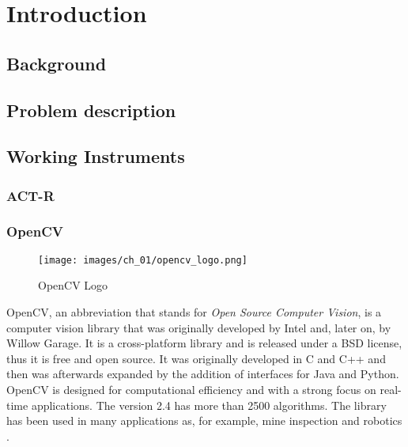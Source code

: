 \chapter{Introduction}
\section{Background}
\section{Problem description}
\section{Working Instruments}
\subsection{ACT-R}
\subsection{OpenCV}
	\begin{wrapfigure}{l}{0.1\textwidth}
  		\begin{center}
  	  	\texttt{[image: images/ch\_01/opencv\_logo.png]}
  		\end{center}
  		\caption{OpenCV Logo}
	\end{wrapfigure}		
	
	OpenCV, an abbreviation that stands for \emph{Open Source Computer Vision}, is a computer vision library that was originally developed by Intel and, later on, by Willow Garage.
	It is a cross-platform library and is released under a BSD license, thus it is free and open source. It was originally developed in C and C++ and then was afterwards expanded by the addition of interfaces for Java and Python. OpenCV is designed for computational efficiency and with a strong focus on real-time applications. The version 2.4 has more than 2500 algorithms. The library has been used in many applications as, for example, mine inspection and robotics \cite{OpenCV:MainWebPage}.
	
	
